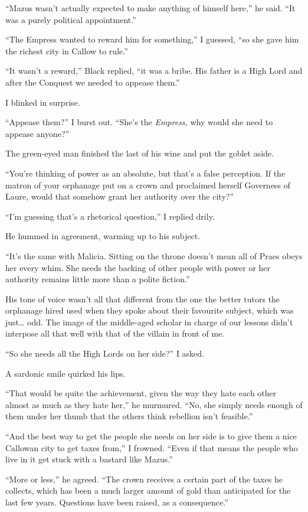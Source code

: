 \documentclass[12pt, openany]{book}
\begin{document}
“Mazus wasn’t actually expected to make anything of himself here,” he said. “It was a purely political appointment.”

“The Empress wanted to reward him for something,” I guessed, “so she gave him the richest city in Callow to rule.”

“It wasn’t a reward,” Black replied, “it was a bribe. His father is a High Lord and after the Conquest we needed to appease them.”

I blinked in surprise.

“Appease them?” I burst out. “She’s the \textit{Empress, }why would she need to appease anyone?”

The green-eyed man finished the last of his wine and put the goblet aside.

“You’re thinking of power as an absolute, but that’s a false perception. If the matron of your orphanage put on a crown and proclaimed herself Governess of Laure, would that somehow grant her authority over the city?”

“I’m guessing that’s a rhetorical question,” I replied drily.

He hummed in agreement, warming up to his subject.

“It’s the same with Malicia. Sitting on the throne doesn’t mean all of Praes obeys her every whim. She needs the backing of other people with power or her authority remains little more than a polite fiction.”

His tone of voice wasn’t all that different from the one the better tutors the orphanage hired used when they spoke about their favourite subject, which was just… odd. The image of the middle-aged scholar in charge of our lessons didn’t interpose all that well with that of the villain in front of me.

“So she needs all the High Lords on her side?” I asked.

A sardonic smile quirked his lips.

“That would be quite the achievement, given the way they hate each other almost as much as they hate her,” he murmured. “No, she simply needs enough of them under her thumb that the others think rebellion isn’t feasible.”

“And the best way to get the people she needs on her side is to give them a nice Callowan city to get taxes from,” I frowned. “Even if that means the people who live in it get stuck with a bastard like Mazus.”

“More or less,” he agreed. “The crown receives a certain part of the taxes he collects, which has been a much larger amount of gold than anticipated for the last few years. Questions have been raised, as a consequence.”
\end{document}
